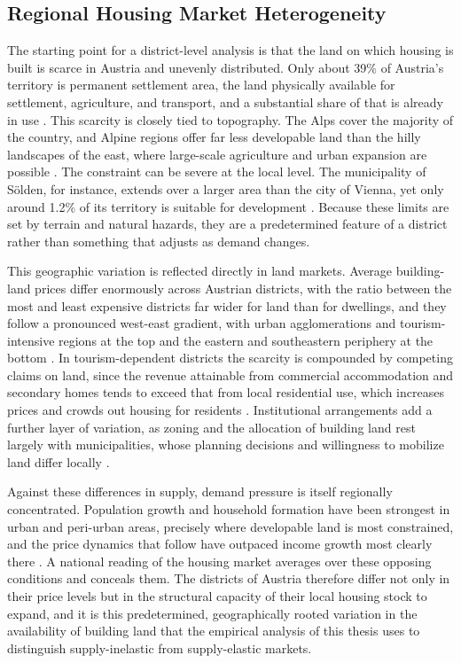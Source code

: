 \documentclass[a4paper,12pt, headsepline]{scrartcl}
\numberwithin{equation}{section}
\begin{document}
\subsection{Regional Housing Market Heterogeneity}\label{subsec:regional-heterogeneity}

The starting point for a district-level analysis is that the land on which housing is built is scarce in Austria and unevenly distributed. Only about 39\% of Austria's territory is permanent settlement area, the land physically available for settlement, agriculture, and transport, and a substantial share of that is already in use \citep{oerok2025}. This scarcity is closely tied to topography. The Alps cover the majority of the country, and Alpine regions offer far less developable land than the hilly landscapes of the east, where large-scale agriculture and urban expansion are possible \citep{schindelegger2025}. The constraint can be severe at the local level. The municipality of Sölden, for instance, extends over a larger area than the city of Vienna, yet only around 1.2\% of its territory is suitable for development \citep{schindelegger2025}. Because these limits are set by terrain and natural hazards, they are a predetermined feature of a district rather than something that adjusts as demand changes.

This geographic variation is reflected directly in land markets. Average building-land prices differ enormously across Austrian districts, with the ratio between the most and least expensive districts far wider for land than for dwellings, and they follow a pronounced west-east gradient, with urban agglomerations and tourism-intensive regions at the top and the eastern and southeastern periphery at the bottom \citep{reiner2023}. In tourism-dependent districts the scarcity is compounded by competing claims on land, since the revenue attainable from commercial accommodation and secondary homes tends to exceed that from local residential use, which increases prices and crowds out housing for residents \citep{schindelegger2025}. Institutional arrangements add a further layer of variation, as zoning and the allocation of building land rest largely with municipalities, whose planning decisions and willingness to mobilize land differ locally \citep{schindelegger2025}.

Against these differences in supply, demand pressure is itself regionally concentrated. Population growth and household formation have been strongest in urban and peri-urban areas, precisely where developable land is most constrained, and the price dynamics that follow have outpaced income growth most clearly there \citep{mundt2024}. A national reading of the housing market averages over these opposing conditions and conceals them. The districts of Austria therefore differ not only in their price levels but in the structural capacity of their local housing stock to expand, and it is this predetermined, geographically rooted variation in the availability of building land that the empirical analysis of this thesis uses to distinguish supply-inelastic from supply-elastic markets.
\end{document}
